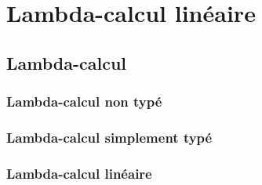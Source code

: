 %
\chapter{Lambda-calcul linéaire}
\label{sec::chapitre2}

\section{Lambda-calcul}
\subsection{Lambda-calcul non typé}
\subsection{Lambda-calcul simplement typé}
\subsection{Lambda-calcul linéaire}

